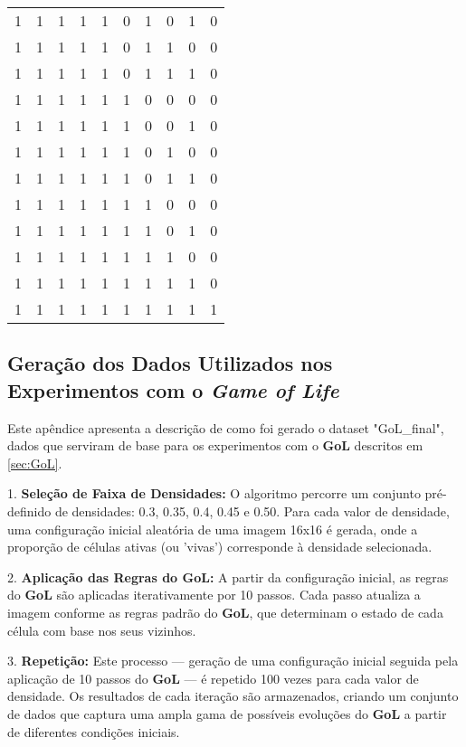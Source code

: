 \begin{longtable}[c]{rrrrrrrrrr}
        1 & 1 & 1 & 1 & 1 & 0 & 1 & 0 & 1 & 0 \\
        1 & 1 & 1 & 1 & 1 & 0 & 1 & 1 & 0 & 0 \\
        1 & 1 & 1 & 1 & 1 & 0 & 1 & 1 & 1 & 0 \\
        1 & 1 & 1 & 1 & 1 & 1 & 0 & 0 & 0 & 0 \\
        1 & 1 & 1 & 1 & 1 & 1 & 0 & 0 & 1 & 0 \\
        1 & 1 & 1 & 1 & 1 & 1 & 0 & 1 & 0 & 0 \\
        1 & 1 & 1 & 1 & 1 & 1 & 0 & 1 & 1 & 0 \\
        1 & 1 & 1 & 1 & 1 & 1 & 1 & 0 & 0 & 0 \\
        1 & 1 & 1 & 1 & 1 & 1 & 1 & 0 & 1 & 0 \\
        1 & 1 & 1 & 1 & 1 & 1 & 1 & 1 & 0 & 0 \\
        1 & 1 & 1 & 1 & 1 & 1 & 1 & 1 & 1 & 0 \\
        1 & 1 & 1 & 1 & 1 & 1 & 1 & 1 & 1 & 1 \\
\end{longtable}


\subsection{Geração dos Dados Utilizados nos Experimentos com o \textit{Game of Life}}

Este apêndice apresenta a descrição de como foi gerado o dataset "GoL\_final", dados que serviram de base para os experimentos com o \textbf{GoL} descritos em \ref{sec:GoL}.

1. \textbf{Seleção de Faixa de Densidades:} O algoritmo percorre um conjunto pré-definido de densidades: 0.3, 0.35, 0.4, 0.45 e 0.50. Para cada valor de densidade, uma configuração inicial aleatória de uma imagem 16x16 é gerada, onde a proporção de células ativas (ou 'vivas') corresponde à densidade selecionada.

2. \textbf{Aplicação das Regras do GoL:} A partir da configuração inicial, as regras do \textbf{GoL} são aplicadas iterativamente por 10 passos. Cada passo atualiza a imagem conforme as regras padrão do \textbf{GoL}, que determinam o estado de cada célula com base nos seus vizinhos.

3. \textbf{Repetição:} Este processo — geração de uma configuração inicial seguida pela aplicação de 10 passos do \textbf{GoL} — é repetido 100 vezes para cada valor de densidade. Os resultados de cada iteração são armazenados, criando um conjunto de dados que captura uma ampla gama de possíveis evoluções do \textbf{GoL} a partir de diferentes condições iniciais.

